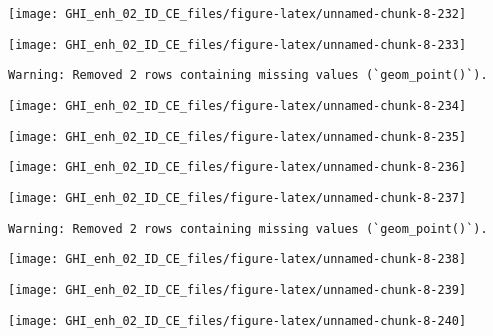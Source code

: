 \documentclass[
  10pt,
  a4paper,oneside]{article}
\begin{document}
\begin{center}\texttt{[image: GHI\_enh\_02\_ID\_CE\_files/figure-latex/unnamed-chunk-8-232]} \end{center}

\begin{center}\texttt{[image: GHI\_enh\_02\_ID\_CE\_files/figure-latex/unnamed-chunk-8-233]} \end{center}

\begin{verbatim}
Warning: Removed 2 rows containing missing values (`geom_point()`).
\end{verbatim}

\begin{center}\texttt{[image: GHI\_enh\_02\_ID\_CE\_files/figure-latex/unnamed-chunk-8-234]} \end{center}

\begin{center}\texttt{[image: GHI\_enh\_02\_ID\_CE\_files/figure-latex/unnamed-chunk-8-235]} \end{center}

\begin{center}\texttt{[image: GHI\_enh\_02\_ID\_CE\_files/figure-latex/unnamed-chunk-8-236]} \end{center}

\begin{center}\texttt{[image: GHI\_enh\_02\_ID\_CE\_files/figure-latex/unnamed-chunk-8-237]} \end{center}

\begin{verbatim}
Warning: Removed 2 rows containing missing values (`geom_point()`).
\end{verbatim}

\begin{center}\texttt{[image: GHI\_enh\_02\_ID\_CE\_files/figure-latex/unnamed-chunk-8-238]} \end{center}

\begin{center}\texttt{[image: GHI\_enh\_02\_ID\_CE\_files/figure-latex/unnamed-chunk-8-239]} \end{center}

\begin{center}\texttt{[image: GHI\_enh\_02\_ID\_CE\_files/figure-latex/unnamed-chunk-8-240]} \end{center}
\end{document}

